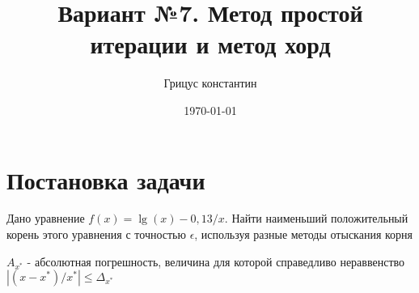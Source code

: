\documentclass{article}
\title{Вариант №7. Метод простой итерации и метод хорд}
\author{Грицус константин}
\date{\today}
\begin{document}
\maketitle

\section{Постановка задачи}

Дано уравнение $f(x) = \lg(x)-0,13/x$. Найти наименьший положительный корень этого уравнения с точностью
$\epsilon$, используя разные методы отыскания корня

$ A_{x^{*}} $ - абсолютная погрешность, величина для которой справедливо
нераввенство $ |(x-x^{*})/x^{*}| \leq \Delta_{x^{*}} $
\end{document}
